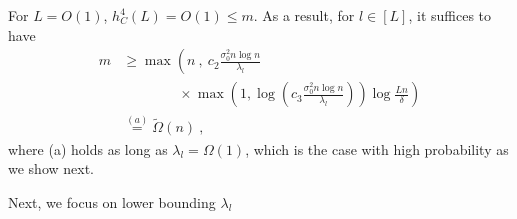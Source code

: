 For $L =O(1)$, $h_C^4(L) = O(1) \leq m$. As a result, for $l \in [L]$, it suffices to have
\begin{equation}
\begin{aligned}
m  &\geq \max\left( n ~,~ c_2 \frac{\sigma_0^2 n \log n}{\lambda_l}\right.\\ &\left.\qquad\qquad\times\max\left(1, \log \left( c_3 \frac{\sigma_0^2 n \log n}{\lambda_l} \right) \right) \log \frac{Ln}{\delta}  \right)\\ %
&\overset{(a)}{=} \tilde{\Omega}(n)~,
\label{eq:m_l_lowerbound}
\end{aligned}
\end{equation}
where (a) holds as long as $\lambda_l = \Omega(1)$, which is the case with high probability as we show next.


 Next, we focus on lower bounding $\lambda_l$ 


